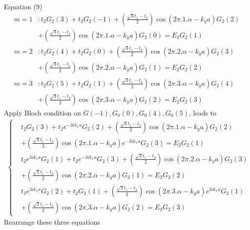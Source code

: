\documentclass{report}
\begin{document}
Equation (9)
\begin{align*}
	m = 1 &: t_{2}G_{2}(3) + t_{2}G_{2}(-1) + \left(\frac{\sqrt{3} t_{1} - t_{2}}{2}\right) \cos(2\pi .1. \alpha - k_y a) G_{2}(2) \\
	&+ \left(\frac{\sqrt{3} t_{1} - t_{2}}{2}\right) \cos(2\pi .1. \alpha - k_y a) G_{2}(0) = E_{2}G_{2}(1) \\
	m = 2 & : t_{2}G_{2}(4) + t_{2}G_{2}(0) + \left(\frac{\sqrt{3} t_{1} - t_{2}}{2}\right) \cos(2\pi .2. \alpha - k_y a) G_{2}(3) \\
	&+ \left(\frac{\sqrt{3} t_{1} - t_{2}}{2}\right) \cos(2\pi .2. \alpha - k_y a) G_{2}(1) = E_{2}G_{2}(2) \\
	m = 3 & : t_{2}G_{2}(5) + t_{2}G_{2}(1) + \left(\frac{\sqrt{3} t_{1} - t_{2}}{2}\right) \cos(2\pi .3. \alpha - k_y a) G_{2}(4) \\
	&+ \left(\frac{\sqrt{3} t_{1} - t_{2}}{2}\right) \cos(2\pi .3. \alpha - k_y a) G_{2}(2) = E_{2}G_{2}(3) 
\end{align*}
Apply Bloch condition on $G(-1),G_{0}(0),G_{0}(4),G_{0}(5)$, leads to
\begin{align*}
	\begin{cases}
		&t_{2}G_{2}(3) + t_{2}e^{-3i k_x a}G_{2}(2) + \left(\frac{\sqrt{3} t_{1} - t_{2}}{2}\right) \cos(2\pi .1. \alpha - k_y a) G_{2}(2) \\
		&+ \left(\frac{\sqrt{3} t_{1} - t_{2}}{2}\right) \cos(2\pi .1. \alpha - k_y a) e^{-3i k_x a}G_{2}(3) = E_{2}G_{2}(1) \\
		&t_{2} e^{3i k_x a}G_{2}(1) + t_{2}e^{-3i k_x a}G_{2}(3) + \left(\frac{\sqrt{3} t_{1} - t_{2}}{2}\right) \cos(2\pi .2. \alpha - k_y a) G_{2}(3) \\
		&+ \left(\frac{\sqrt{3} t_{1} - t_{2}}{2}\right) \cos(2\pi .2. \alpha - k_y a) G_{2}(1) = E_{2}G_{2}(2) \\
		&t_{2}e^{3i k_x a} G_{2}(2) + t_{2}G_{2}(1) + \left(\frac{\sqrt{3} t_{1} - t_{2}}{2}\right) \cos(2\pi .3. \alpha - k_y a) e^{3i k_x a}G_{2}(1) \\
		&+ \left(\frac{\sqrt{3} t_{1} - t_{2}}{2}\right) \cos(2\pi .3. \alpha - k_y a) G_{2}(2) = E_{2}G_{2}(3) 
	\end{cases}
\end{align*}
Rearrange these three equations
\end{document}

